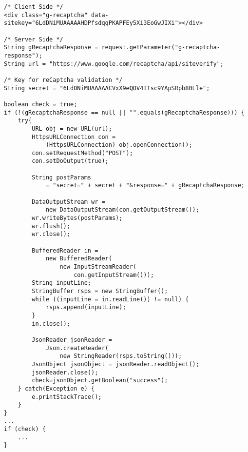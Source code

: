 \begin{lstlisting}
/* Client Side */
<div class="g-recaptcha" data-sitekey="6LdDNiMUAAAAAHDPfsdqqPKAPFEy5Xi3EoGwJIXi"></div>

/* Server Side */
String gRecaptchaResponse = request.getParameter("g-recaptcha-response");
String url = "https://www.google.com/recaptcha/api/siteverify";

/* Key for reCaptcha validation */
String secret = "6LdDNiMUAAAAACVxX9eQOV4ITsc9YApSRpb80Lle";

boolean check = true;
if (!(gRecaptchaResponse == null || "".equals(gRecaptchaResponse))) {
	try{
		URL obj = new URL(url);
		HttpsURLConnection con =
			(HttpsURLConnection) obj.openConnection();
		con.setRequestMethod("POST");
		con.setDoOutput(true);

		String postParams
			= "secret=" + secret + "&response=" + gRecaptchaResponse;

		DataOutputStream wr =
			new DataOutputStream(con.getOutputStream());
		wr.writeBytes(postParams);
		wr.flush();
		wr.close();

		BufferedReader in =
			new BufferedReader(
				new InputStreamReader(
					con.getInputStream()));
		String inputLine;
		StringBuffer rsps = new StringBuffer();
		while ((inputLine = in.readLine()) != null) {
			rsps.append(inputLine);
		}
		in.close();

		JsonReader jsonReader =
			Json.createReader(
				new StringReader(rsps.toString()));
		JsonObject jsonObject = jsonReader.readObject();
		jsonReader.close();
		check=jsonObject.getBoolean("success");
	} catch(Exception e) {
		e.printStackTrace();
	}
}
...
if (check) {
	...
}
\end{lstlisting}
